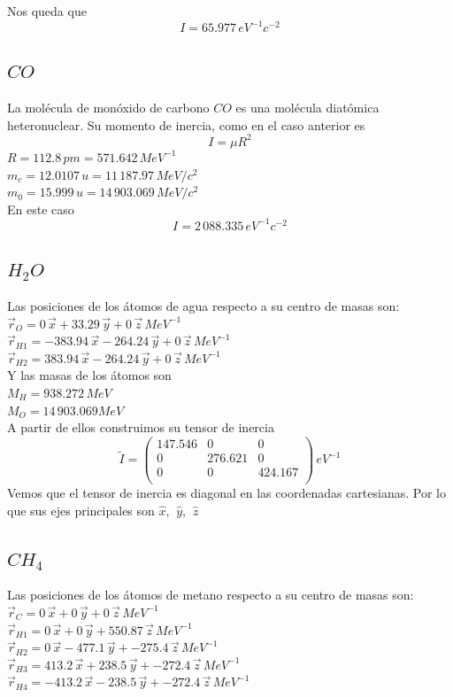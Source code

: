 \documentclass[a4paper]{article}
\begin{document}
 Nos queda que $$I=65.977 \, eV^{-1}c^{-2}$$
 \subsection{$CO$}
 La molécula de monóxido de carbono $CO$ es una molécula diatómica heteronuclear. Su momento de inercia, como en el caso anterior es $$I=\mu R^2$$
 $R=112.8 \, pm=571.642\, MeV^{-1}$\\
 $m_c=12.0107 \, u=11\, 187.97 \, MeV/c^2$\\
 $m_0=15.999\, u=14\, 903.069\, MeV/c^2$\\
 En este caso 
 $$I= 2\, 088.335\,eV^{-1}c^{-2}$$
 \subsection{$H_2O$}
 Las posiciones de los átomos de agua respecto a su centro de masas son:\\
 $\vec r_O = 0\, \vec x + 33.29 \, \vec y + 0 \, \vec z \, MeV^{-1}$\\
 $\vec r_{H1} =-383.94\, \vec x-264.24 \, \vec y + 0 \, \vec z \, MeV^{-1}$\\
 $\vec r_{H2} = 383.94 \, \vec x -264.24 \, \vec y + 0 \, \vec z \, MeV^{-1}$\\
 
 Y las masas de los átomos son\\
 $M_H = 938.272 \, MeV$\\
 $M_O = 14\, 903.069 MeV$\\
 
 A partir de ellos construimos su tensor de inercia
 $$ \tilde I =
 \begin{pmatrix}
 147.546 & 0 & 0 \\
 0 & 276.621 & 0 \\
 0 & 0 & 424.167\\
 \end{pmatrix}
 \, eV^{-1}
 $$
 Vemos que el tensor de inercia es diagonal en las coordenadas cartesianas. Por lo que sus ejes principales son $ \hat x, \,\ \hat y, \,\ \hat z$
 \subsection{$CH_4$}
Las posiciones de los átomos  de metano respecto a su centro de masas son:
 $\vec r_C = 0\, \vec x + 0 \, \vec y + 0 \, \vec z \, MeV^{-1}$\\
 $\vec r_{H1} = 0\, \vec x+0 \, \vec y + 550.87 \, \vec z \, MeV^{-1}$\\
 $\vec r_{H2} = 0\, \vec x -477.1 \, \vec y + -275.4\, \vec z \, MeV^{-1}$\\
 $\vec r_{H3} = 413.2\, \vec x + 238.5 \, \vec y + -272.4 \, \vec z \, MeV^{-1}$\\
 $\vec r_{H4} = -413.2 \, \vec x -238.5 \, \vec y + -272.4 \, \vec z \, MeV^{-1}$\\
 
\end{document}
